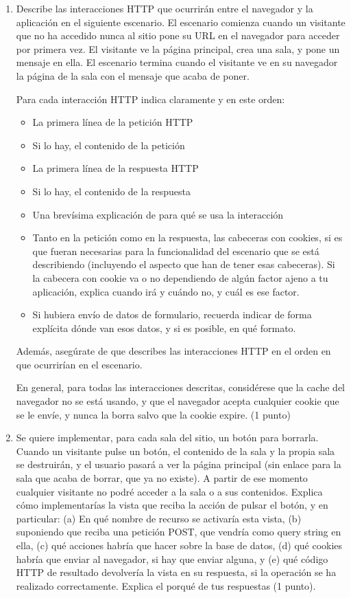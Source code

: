 \begin{enumerate}
\item Describe las interacciones HTTP que ocurrirán entre el navegador y la aplicación en el siguiente escenario. El escenario comienza cuando un visitante que no ha accedido nunca al sitio pone su URL en el navegador para acceder por primera vez. El visitante ve la página principal, crea una sala, y pone un mensaje en ella. El escenario termina cuando el visitante ve en su navegador la página de la sala con el mensaje que acaba de poner.

  Para cada interacción HTTP indica claramente y en este orden:
  \begin{itemize}
  \item La primera línea de la petición HTTP
  \item Si lo hay, el contenido de la petición
  \item La primera línea de la respuesta HTTP
  \item Si lo hay, el contenido de la respuesta
  \item Una brevísima explicación de para qué se usa la interacción
  \item Tanto en la petición como en la respuesta, las cabeceras con cookies, si es que fueran necesarias para la funcionalidad del escenario que se está describiendo (incluyendo el aspecto que han de tener esas cabeceras). Si la cabecera con cookie va o no dependiendo de algún factor ajeno a tu aplicación, explica cuando irá y cuándo no, y cuál es ese factor.
  \item Si hubiera envío de datos de formulario, recuerda indicar de forma explícita dónde van esos datos, y si es posible, en qué formato.
  \end{itemize}

  Además, asegúrate de que describes las interacciones HTTP en el orden en que ocurrirían en el escenario.

  En general, para todas las interacciones descritas, considérese que la cache del navegador no se está usando, y que el navegador acepta cualquier cookie que se le envíe, y nunca la borra salvo que la cookie expire. (1 punto)

\item Se quiere implementar, para cada sala del sitio, un botón para borrarla. Cuando un visitante pulse un botón, el contenido de la sala y la propia sala se destruirán, y el usuario pasará a ver la página principal (sin enlace para la sala que acaba de borrar, que ya no existe). A partir de ese momento cualquier visitante no podré acceder a la sala o a sus contenidos. Explica cómo implementarías la vista que reciba la acción de pulsar el botón, y en particular: (a) En qué nombre de recurso se activaría esta vista, (b) suponiendo que reciba una petición POST, que vendría como query string en ella, (c) qué acciones habría que hacer sobre la base de datos, (d) qué cookies habría que enviar al navegador, si hay que enviar alguna, y (e) qué código HTTP de resultado devolvería la vista en su respuesta, si la operación se ha realizado correctamente. Explica el porqué de tus respuestas (1 punto). 
\end{enumerate}

